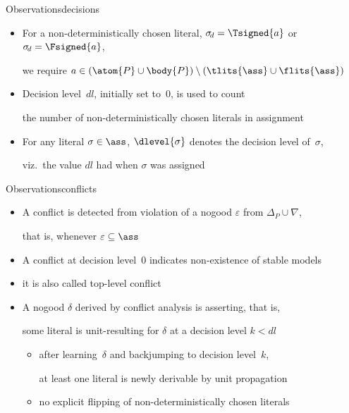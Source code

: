 \begin{frame}[shrink=35]%
  
\end{frame}
\begin{frame}{Observations}{decisions}
  \bigskip
  \begin{itemize}
    \item For a non-deterministically chosen literal,
          $\sigma_{\!d}=\Tsigned{a}$ or $\sigma_{\!d}=\Fsigned{a}$,
          \par
          we require $a\in(\atom{P}\cup\body{P})\setminus(\tlits{\ass}\cup\flits{\ass})$
          \smallskip
    \item Decision level~$\mathit{dl}$, initially set to~$0$, is used to count
          \par
          the number of non-deterministically chosen literals in assignment~\ass
          \smallskip
    \item For any literal $\sigma\in\ass$,
          $\dlevel{\sigma}$ denotes the decision level of~$\sigma$,
          \par
          viz.\ the value $\mathit{dl}$ had when $\sigma$ was assigned
  \end{itemize}
\end{frame}
\begin{frame}{Observations}{conflicts}
  \bigskip
  \begin{itemize}
    \item A conflict is detected from violation of a nogood $\varepsilon$ from $\Delta_P\cup\nabla$,
          \par
          that is, whenever $\varepsilon\subseteq\ass$
          \smallskip
    \item A conflict at decision level~$0$%
          indicates non-existence of stable models
    \item[] it is also called top-level conflict
      \bigskip
    \item<4-> A nogood $\delta$ derived by conflict analysis is
      \alert{asserting}, that is,
      \par
      some literal is unit-resulting for $\delta$ at a decision level $k<\mathit{dl}$
      \begin{itemize}\normalsize
        \item after learning~$\delta$ and backjumping to decision level~$k$,

              at least one literal is newly derivable by unit propagation
              \smallskip
        \item no explicit flipping of non-deterministically chosen literals
      \end{itemize}
  \end{itemize}
\end{frame}
